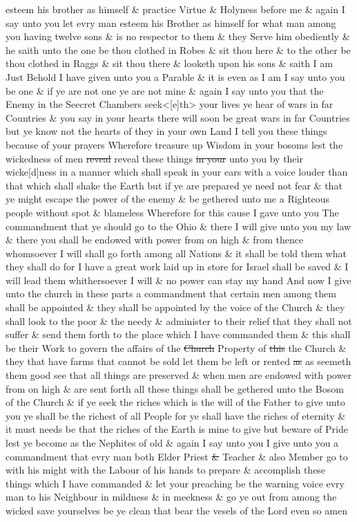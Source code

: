 esteem his brother as himself \& practice Virtue \& Holyness before me \& again I say unto you let evry man esteem his Brother as himself for what man among you having twelve sons \& is no respector to them \& they Serve him obediently \& he saith unto the one be thou clothed in Robes \& sit thou here \& to the other be thou clothed in Raggs \& sit thou there \& looketh upon his sons \& saith I am Just Behold I have given unto you a Parable \& it is even as I am I say unto you be one \& if ye are not one ye are not mine \& again I say unto you that the Enemy in the Seecret Chambers seek<[e]th> your lives ye hear of wars in far Countries \& you say in your hearts there will soon be great wars in far Countries but ye know not the hearts of they in your own Land I tell you these things because of your prayers Wherefore treasure up Wisdom in your bosoms lest the wickedness of men \sout{reveal} reveal these things \sout{in your} unto you by their wicke[d]ness in a manner which shall speak in your ears with a voice louder than that which shall shake the Earth but if ye are prepared ye need not fear \& that ye might escape the power of the enemy \& be gethered unto me a Righteous people without spot \& blameless Wherefore for this cause I gave unto you The commandment that ye should go to the Ohio \& there I will give unto you my law \& there you shall be endowed with power from on high \& from thence whomsoever I will shall go forth among all Nations \& it shall be told them what they shall do for I have a great work laid up in store for Israel shall be saved \& I will lead them whithersoever I will \& no power can stay my hand And now I give unto the church in these parts a commandment that certain men among them shall be appointed \& they shall be appointed by the voice of the Church \& they shall look to the poor \& the needy \& administer to their relief that they shall not suffer \& send them forth to the place which I have commanded them \& this shall be their Work to govern the affairs of the \sout{Church} Property of \sout{this} the Church \& they that have farms that cannot be sold let them be left or rented \sout{as} as seemeth them good see that all things are preserved \& when men are endowed with power from on high \& are sent forth all these things shall be gethered unto the Bosom of the Church \& if ye seek the riches which is the will of the Father to give unto you ye shall be the richest of all People for ye shall have the riches of eternity \& it must needs be that the riches of the Earth is mine to give but beware of Pride lest ye become as the Nephites of old \& again I say unto you I give unto you a commandment that evry man both Elder Priest \sout{\&} Teacher \& also Member go to with his might with the Labour of his hands to prepare \& accomplish these things which I have commanded \& let your preaching be the warning voice evry man to his Neighbour in mildness \& in meekness \& go ye out from among the wicked save yourselves be ye clean that bear the vesels of the Lord even so amen
				
